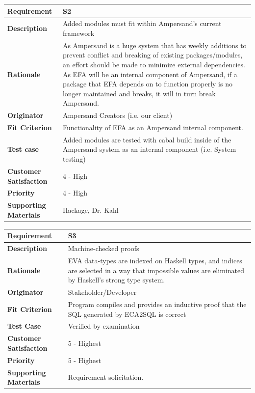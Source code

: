 \documentclass[12pt]{report}
\begin{document}
{\setlength{\tabcolsep}{6pt} %
    \begin{tabularx}{\textwidth}{>{\bfseries}m{3cm}X}
        Requirement & S2 \\ 
        \midrule
        \endhead
        Description  & Added modules must fit within Ampersand's current 
        framework
        \\	Rationale & As Ampersand is a huge system that has weekly additions 
        to prevent conflict and breaking of existing packages/modules, an 
        effort should be made to minimize external dependencies. As EFA will be 
        an internal component of Ampersand, if a package that EFA depends on to 
        function properly is no longer maintained and breaks, it will in turn 
        break Ampersand.
        \\	Originator & Ampersand Creators (i.e. our client)        
        \\	Fit Criterion & Functionality of EFA as an Ampersand internal 
        component.
        \\ Test case & Added modules are tested with cabal build inside of the
        Ampersand system as an internal component (i.e. System testing)
        \\	Customer Satisfaction & 4 - High 
        \\	Priority & 4 - High
        \\	Supporting Materials & Hackage, Dr. Kahl
        \vspace{12pt}
    \end{tabularx}
}
{\setlength{\tabcolsep}{6pt} %
    \begin{tabularx}{\textwidth}{>{\bfseries}m{3cm}X}
        Requirement & S3 \\ 
        \midrule
        \endhead
        Description  & Machine-checked proofs
        \\	Rationale & EVA data-types are indexed on Haskell types, and 
        indices are selected in a way that impossible values are eliminated by 
        Haskell's strong type system.
        \\	Originator & Stakeholder/Developer
        
        \\	Fit Criterion & Program compiles and provides an inductive proof 
        that the SQL generated by ECA2SQL is correct
        \\ Test Case & Verified by examination
        \\	Customer Satisfaction & 5 - Highest 
        \\	Priority & 5 - Highest 
        \\	Supporting Materials & Requirement solicitation.
        \vspace{12pt}
    \end{tabularx}
}
\end{document}
